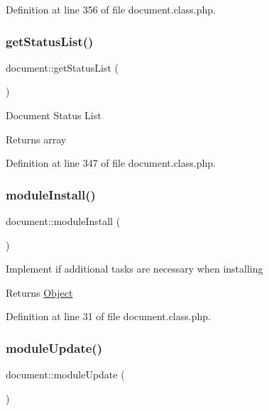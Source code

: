 Definition at line 356 of file document.\+class.\+php.

\hypertarget{classdocument_ae90cc64e28afdfa204844ed6d03b40e7}{}\label{classdocument_ae90cc64e28afdfa204844ed6d03b40e7} 
\subsubsection{\texorpdfstring{get\+Status\+List()}{getStatusList()}}
{\footnotesize\ttfamily document\+::get\+Status\+List (\begin{DoxyParamCaption}{ }\end{DoxyParamCaption})}

Document Status List \begin{DoxyReturn}{Returns}
array 
\end{DoxyReturn}


Definition at line 347 of file document.\+class.\+php.

\hypertarget{classdocument_a712db6c7542d0ec2cfdde35583a3b7ba}{}\label{classdocument_a712db6c7542d0ec2cfdde35583a3b7ba} 
\subsubsection{\texorpdfstring{module\+Install()}{moduleInstall()}}
{\footnotesize\ttfamily document\+::module\+Install (\begin{DoxyParamCaption}{ }\end{DoxyParamCaption})}

Implement if additional tasks are necessary when installing \begin{DoxyReturn}{Returns}
\hyperlink{classObject}{Object} 
\end{DoxyReturn}


Definition at line 31 of file document.\+class.\+php.

\hypertarget{classdocument_ad0568fe26b80e3bc328a3fae4997354c}{}\label{classdocument_ad0568fe26b80e3bc328a3fae4997354c} 
\subsubsection{\texorpdfstring{module\+Update()}{moduleUpdate()}}
{\footnotesize\ttfamily document\+::module\+Update (\begin{DoxyParamCaption}{ }\end{DoxyParamCaption})}

